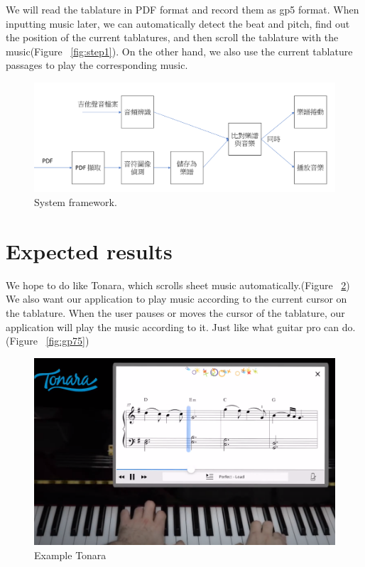 \documentclass[10pt,twocolumn,letterpaper]{article}
\begin{document}
\begin{CJK}{UTF8}{bsmi}
We will read the tablature in PDF format and record them as gp5 format. When inputting music later, we can automatically detect the beat and pitch, find out the position of the current tablatures, and then scroll the tablature with the music(Figure ~\ref{fig:step1}). On the other hand, we also use the current tablature passages to play the corresponding music.

\begin{figure}
\begin{center}
\includegraphics[width=.9\linewidth]{step1.png}
\end{center}
   \caption{System framework.}
\label{fig:step}
\end{figure}

\section{Expected results}

We hope to do like Tonara\cite{Tonara}, which scrolls sheet music automatically.(Figure ~\ref{fig:tonara}) We also want our application to play music according to the current cursor on the tablature. When the user pauses or moves the cursor of the tablature, our application will play the music according to it. Just like what guitar pro can do.(Figure ~\ref{fig:gp75})

\begin{figure}[t]
\begin{center}
   \includegraphics[width=0.8\linewidth]{tonara.png}
\end{center}
   \caption{Example Tonara\cite{Tonara2}}
\label{fig:long}
\label{fig:tonara}
\end{figure}


\end{CJK}
\end{document}
